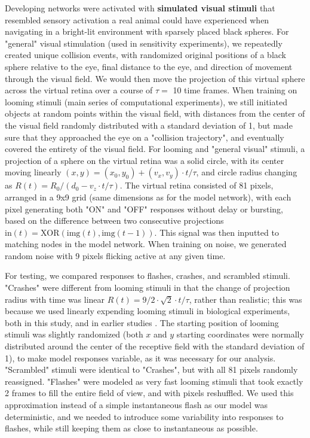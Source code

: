 \documentclass{article}
\begin{document}
Developing networks were activated with \textbf{simulated visual stimuli} that resembled sensory activation a real animal could have experienced when navigating in a bright-lit environment with sparsely placed black spheres. For "general" visual stimulation (used in sensitivity experiments), we repeatedly created unique collision events, with randomized original positions of a black sphere relative to the eye, final distance to the eye, and direction of movement through the visual field. We would then move the projection of this virtual sphere across the virtual retina over a course of $\tau=$ 10 time frames.  When training on looming stimuli (main series of computational experiments), we still initiated objects at random points within the visual field, with distances from the center of the visual field randomly distributed with a standard deviation of 1, but made sure that they approached the eye on a "collision trajectory", and eventually covered the entirety of the visual field. For looming and "general visual" stimuli, a projection of a sphere on the virtual retina was a solid circle, with its center moving linearly $(x,y) = (x_0,y_0)+(v_x,v_y)\cdot t/\tau$, and circle radius changing as $R(t) = R_0/(d_0 - v_z \cdot t/\tau)$. The virtual retina consisted of 81 pixels, arranged in a 9x9 grid (same dimensions as for the model network), with each pixel generating both "ON" and "OFF" responses without delay or bursting, based on the difference between two consecutive projections $\text{in}(t) = \text{XOR}(\text{img}(t),\text{img}(t-1))$. This signal was then inputted to matching nodes in the model network. When training on noise, we generated random noise with 9 pixels flicking active at any given time. 

For testing, we compared responses to flashes, crashes, and scrambled stimuli. "Crashes" were different from looming stimuli in that the change of projection radius with time was linear $R(t) = 9/2 \cdot \sqrt{2} \cdot t/\tau$, rather than realistic; this was because we used linearly expending looming stimuli in biological experiments, both in this study, and in earlier studies \citep{khakhalin2014}. The starting position of looming stimuli was slightly randomized (both $x$ and $y$ starting coordinates were normally distributed around the center of the receptive field with the standard deviation of 1), to make model responses variable, as it was necessary for our analysis. "Scrambled" stimuli were identical to "Crashes", but with all 81 pixels randomly reassigned. "Flashes" were modeled as very fast looming stimuli that took exactly 2 frames to fill the entire field of view, and with pixels reshuffled. We used this approximation instead of a simple instantaneous flash as our model was deterministic, and we needed to introduce some variability into responses to flashes, while still keeping them as close to instantaneous as possible. 
\end{document}
